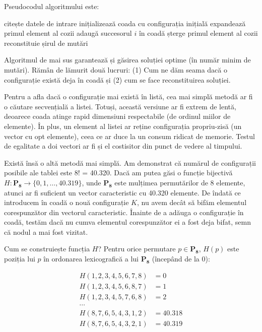 Pseudocodul algoritmului este:

\vspace{\algskip}
\begin{algorithmic}[1]
  \STATE citește datele de intrare
  \STATE inițializează coada cu configurația inițială
  \STATE expandează primul element al cozii
  \STATE adaugă succesorul $i$ în coadă
  \ENDIF
  \ENDFOR
  \STATE șterge primul element al cozii
  \ENDWHILE
  \STATE reconstituie șirul de mutări
\end{algorithmic}

Algoritmul de mai sus garantează și găsirea soluției optime (în număr minim de
mutări). Rămân de lămurit două lucruri: (1) Cum ne dăm seama dacă o
configurație există deja în coadă și (2) cum se face reconstituirea soluției.

Pentru a afla dacă o configurație mai există în listă, cea mai simplă metodă
ar fi o căutare secvențială a listei. Totuși, această versiune ar fi extrem de
lentă, deoarece coada atinge rapid dimensiuni respectabile (de ordinul miilor
de elemente). În plus, un element al listei ar reține configurația
propriu-zisă (un vector cu opt elemente), ceea ce ar duce la un consum ridicat
de memorie. Testul de egalitate a doi vectori ar fi și el costisitor din punct
de vedere al timpului.

Există însă o altă metodă mai simplă. Am demonstrat că numărul de configurații
posibile ale tablei este 8! = 40.320.  Dacă am putea găsi o funcție bijectivă
$H: \mathbf{P_8} \to \{0, 1, \dots, 40.319\}$, unde $\mathbf{P_8}$ este
mulțimea permutărilor de 8 elemente, atunci ar fi suficient un vector
caracteristic cu 40.320 elemente. De îndată ce introducem în coadă o nouă
configurație $K$, nu avem decât să bifăm elementul corespunzător din vectorul
caracteristic. Înainte de a adăuga o configurație în coadă, testăm dacă nu
cumva elementul corespunzător ei a fost deja bifat, semn că nodul a mai fost
vizitat.

Cum se construiește funcția $H$? Pentru orice permutare $p \in \mathbf{P_8}$,
$H(p)$ este poziția lui $p$ în ordonarea lexicografică a lui $\mathbf{P_8}$
(începând de la 0):

\begin{align*}
H(1, 2, 3, 4, 5, 6, 7, 8) & = 0 \\
H(1, 2, 3, 4, 5, 6, 8, 7) & = 1 \\
H(1, 2, 3, 4, 5, 7, 6, 8) & = 2 \\
\cdots \\
H(8, 7, 6, 5, 4, 3, 1, 2) & = 40.318 \\
H(8, 7, 6, 5, 4, 3, 2, 1) & = 40.319 \\
\end{align*}


